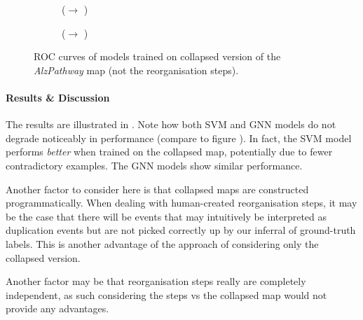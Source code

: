 \documentclass[
	fontsize=10pt, %
	twoside=false, %
	secnumdepth=1, %
  toc=indentunnumbered %
]{kaobook}
\begin{document}
\begin{figure}[h]
  \centering
  \begin{subfigure}[h]{0.48\linewidth}
    \caption{(\ADLast $\rightarrow$ \PDMap)}
  \end{subfigure}
  \begin{subfigure}[h]{0.48\linewidth}
    \caption{(\ADLast $\rightarrow$ \ReconMap)}
  \end{subfigure}
  \caption{ROC curves of models trained on collapsed version of the
    \textit{AlzPathway} map (not the reorganisation steps).}
  \label{fig:importance-reorganisation-steps}
\end{figure}

\paragraph{Results \& Discussion} The results are illustrated in
. Note how both SVM and GNN models do
not degrade noticeably in performance (compare to figure ). In
fact, the SVM model performs \textit{better} when trained on the collapsed map,
potentially due to fewer contradictory examples. The GNN models show similar
performance.


Another factor to consider here is that collapsed maps are constructed
programmatically. When dealing with human-created reorganisation steps, it may
be the case that there will be events that may intuitively be interpreted as
duplication events but are not picked correctly up by our inferral of
ground-truth labels. This is another advantage of the approach of considering
only the collapsed version.

Another factor may be that reorganisation steps really are completely
independent, as such considering the steps vs the collapsed map would not
provide any advantages.

\end{document}
